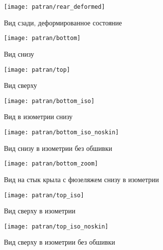 \begin{figure}[H]
\centering
\texttt{[image: patran/rear\_deformed]}
\caption{Вид сзади, деформированное состояние}
\label{fig:patranRearDeformed}
\end{figure}


\begin{figure}[H]
\centering
\texttt{[image: patran/bottom]}
\caption{Вид снизу}
\label{fig:patranBottom}
\end{figure}


\begin{figure}[H]
\centering
\texttt{[image: patran/top]}
\caption{Вид сверху}
\label{fig:patranTop}
\end{figure}


\begin{figure}[H]
\centering
\texttt{[image: patran/bottom\_iso]}
\caption{Вид в изометрии снизу}
\label{fig:patranBottomIso}
\end{figure}

\begin{figure}[H]
\centering
\texttt{[image: patran/bottom\_iso\_noskin]}
\caption{Вид снизу в изометрии без обшивки}
\label{fig:patranBottomIsoWithoutSkin}
\end{figure}

\begin{figure}[H]
\centering
\texttt{[image: patran/bottom\_zoom]}
\caption{Вид на стык крыла с фюзеляжем снизу в изометрии}
\label{fig:patranBottomIsoZoom}
\end{figure}


\begin{figure}[H]
\centering
\texttt{[image: patran/top\_iso]}
\caption{Вид сверху в изометрии}
\label{fig:patranTopIso}
\end{figure}

\begin{figure}[H]
\centering
\texttt{[image: patran/top\_iso\_noskin]}
\caption{Вид сверху в изометрии без обшивки}
\label{fig:patranTopIsoWithoutSk}
\end{figure}

%
